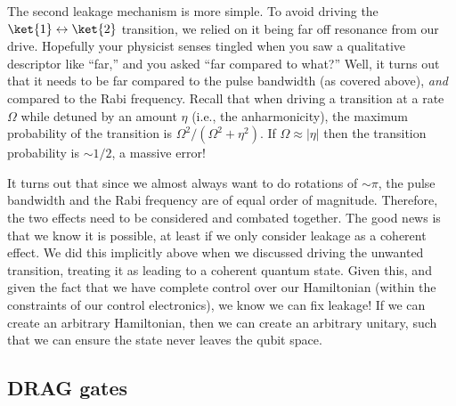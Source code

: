 The second leakage mechanism is more simple. To avoid driving the $\ket{1}\leftrightarrow\ket{2}$ transition, we relied on it being far off resonance from our drive. Hopefully your physicist senses tingled when you saw a qualitative descriptor like ``far,'' and you asked ``far compared to what?'' Well, it turns out that it needs to be far compared to the pulse bandwidth (as covered above), \textit{and} compared to the Rabi frequency. Recall that when driving a transition at a rate $\Omega$ while detuned by an amount $\eta$ (i.e., the anharmonicity), the maximum probability of the transition is $\Omega^2/(\Omega^2+\eta^2)$. If $\Omega\approx |\eta|$ then the transition probability is $\sim 1/2$, a massive error!

It turns out that since we almost always want to do rotations of $\sim\pi$, the pulse bandwidth and the Rabi frequency are of equal order of magnitude. Therefore, the two effects need to be considered and combated together. The good news is that we know it is possible, at least if we only consider leakage as a coherent effect. We did this implicitly above when we discussed driving the unwanted transition, treating it as leading to a coherent quantum state. Given this, and given the fact that we have complete control over our Hamiltonian (within the constraints of our control electronics), we know we can fix leakage! If we can create an arbitrary Hamiltonian, then we can create an arbitrary unitary, such that we can ensure the state never leaves the qubit space. 

\subsection{DRAG gates}

\label{sec:DRAG}
